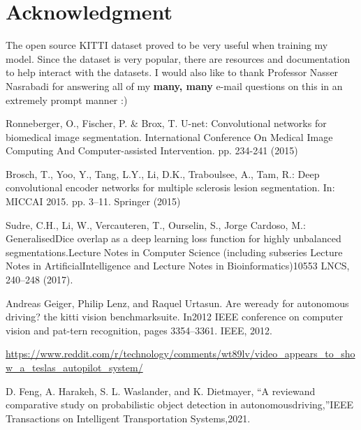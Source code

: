 \documentclass[Location Location Location! : Exploring Image Segmentation Problem In Urban Driving Scenarios]{IEEEtran}
\begin{document}
\section*{Acknowledgment}
The open source KITTI \cite{kitti} dataset proved to be very useful when training my model. Since the dataset is very popular, there are resources and documentation to help interact with the datasets. I would also like to thank Professor Nasser Nasrabadi for answering all of my \textbf{many, many}  e-mail questions on this  in an extremely prompt manner :) 

\begin{thebibliography}{00}
 Ronneberger, O., Fischer, P. & Brox, T. U-net: Convolutional networks for biomedical image segmentation. International  Conference  On  Medical  Image  Computing And  Computer-assisted  Intervention.  pp.  234-241 (2015)

 Brosch, T., Yoo, Y., Tang, L.Y., Li, D.K., Traboulsee, A., Tam, R.: Deep convolutional encoder networks for multiple sclerosis lesion segmentation. In: MICCAI
2015. pp. 3–11. Springer (2015)

 Sudre, C.H., Li, W., Vercauteren, T., Ourselin, S., Jorge Cardoso, M.: GeneralisedDice overlap as a deep learning loss function for highly unbalanced segmentations.Lecture Notes in Computer Science (including subseries Lecture Notes in ArtificialIntelligence and Lecture Notes in Bioinformatics)10553 LNCS, 240–248 (2017).

 Andreas Geiger, Philip Lenz, and Raquel Urtasun.  Are weready for autonomous driving?   the kitti vision benchmarksuite. In2012 IEEE conference on computer vision and pat-tern recognition, pages 3354–3361. IEEE, 2012.

 \url{https://www.reddit.com/r/technology/comments/wt89lv/video_appears_to_show_a_teslas_autopilot_system/}

 D.  Feng,  A.  Harakeh,  S.  L.  Waslander,  and  K.  Dietmayer,  “A  reviewand comparative study on probabilistic object detection in autonomousdriving,”IEEE  Transactions  on  Intelligent  Transportation  Systems,2021. 

\end{thebibliography}
\vspace{12pt}
\end{document}
